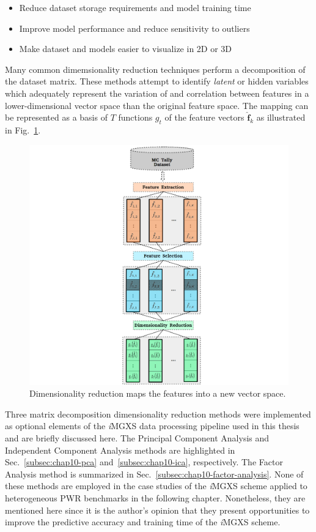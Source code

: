 \begin{itemize}[noitemsep]
\item Reduce dataset storage requirements and model training time
\item Improve model performance and reduce sensitivity to outliers
\item Make dataset and models easier to visualize in 2D or 3D
\end{itemize}

\noindent Many common dimemsionality reduction techniques perform a decomposition of the dataset matrix. These methods attempt to identify \textit{latent} or hidden variables which adequately represent the variation of and correlation between features in a lower-dimensional vector space than the original feature space. The mapping can be represented as a basis of $T$ functions $g_{t}$ of the feature vectors $\boldsymbol{\hat{f}}_{k}$ as illustrated in Fig.~\ref{fig:chap10-agglomerate}.

\begin{figure}[h!]
\centering
\includegraphics[width=0.95\linewidth]{figures/unsupervised/features/engineering/reduce}
\vspace{2mm}
\caption[\textit{i}MGXS dimensionality reduction]{Dimensionality reduction maps the features into a new vector space.}
\label{fig:chap10-agglomerate}
\end{figure}

Three matrix decomposition dimensionality reduction methods were implemented as optional elements of the \textit{i}\ac{MGXS} data processing pipeline used in this thesis and are briefly discussed here. The Principal Component Analysis and Independent Component Analysis methods are highlighted in Sec.~\ref{subsec:chap10-pca} and~\ref{subsec:chap10-ica}, respectively. The Factor Analysis method is summarized in Sec.~\ref{subsec:chap10-factor-analysis}. None of these methods are employed in the case studies of the \textit{i}\ac{MGXS} scheme applied to heterogeneous \ac{PWR} benchmarks in the following chapter. Nonetheless, they are mentioned here since it is the author's opinion that they present opportunities to improve the predictive accuracy and training time of the \textit{i}\ac{MGXS} scheme.

